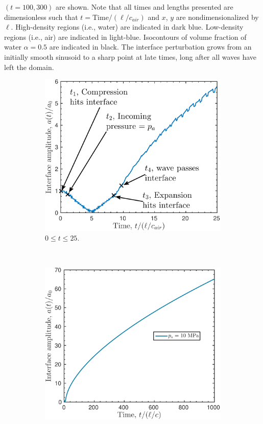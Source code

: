 $(t=100, 300)$ are shown. Note that all times and lengths presented are
dimensionless such that $t = \text{Time}/\left(\ell/c_{air}\right)$ and $x$,
$y$ are nondimensionalized by $\ell$. High-density regions (i.e.,
water) are indicated in dark blue. Low-density regions (i.e., air) are
indicated in light-blue. Isocontours of volume fraction of water
$\alpha=0.5$ are indicated in black. The interface
perturbation grows from an initially smooth sinusoid to a sharp point
at late times, long after all waves have left the domain.
% 
\begin{figure}[h] 
  \centering
  \begin{subfigure}[b]{0.45\textwidth}
    \centering
    \includegraphics[width=\textwidth]{./figs/lung_figs/trapz10_intf_schematic.pdf}
    \caption{\label{fig:trapz10_interface25} $0\leq t \leq 25$.}
  \end{subfigure}
  ~
  \begin{subfigure}[b]{0.45\textwidth}
    \centering
    \includegraphics[width=\textwidth]{./figs/lung_figs/trapz10_intf_t1000.pdf}%

\end{subfigure}
\end{figure}
